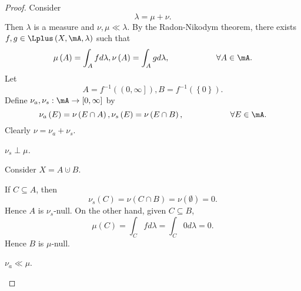 \documentclass[pmath451]{subfiles}
\begin{document}
    \begin{proof}
        Consider
        \begin{equation*}
            \lambda = \mu+\nu.
        \end{equation*}
        Then $\lambda$ is a measure and $\nu,\mu\ll\lambda$. By the Radon-Nikodym theorem, there exists $f,g\in\Lplus\left( X,\mA,\lambda \right)$ such that
        \begin{equation*}
            \mu\left( A \right) = \int_Afd\lambda, \nu\left( A \right) = \int_Agd\lambda,\hspace{2cm}\forall A\in\mA.
        \end{equation*}
        Let
        \begin{equation*}
            A = f^{-1}\left( \left( 0,\infty \right] \right), B = f^{-1}\left( \left\lbrace 0 \right\rbrace \right).
        \end{equation*}
        Define $\nu_a,\nu_s:\mA\to\left[ 0,\infty \right]$ by
        \begin{equation*}
            \nu_a\left( E \right) = \nu\left( E\cap A \right), \nu_s\left( E \right) = \nu\left( E\cap B \right), \hspace{2cm}\forall E\in\mA.
        \end{equation*}
        Clearly $\nu = \nu_a+\nu_s$.

        \begin{claim}
            \textit{$\nu_s\perp\mu$.}

            Consider $X=A\cupdot B$.

            If $C\subseteq A$, then
            \begin{equation*}
                \nu_s\left( C \right) = \nu\left( C\cap B \right) = \nu\left( \emptyset \right) = 0.
            \end{equation*}
            Hence $A$ is $\nu_s$-null. On the other hand, given $C\subseteq B$,
            \begin{equation*}
                \mu\left( C \right) = \int_Cfd\lambda = \int_C 0d\lambda = 0.
            \end{equation*}
            Hence $B$ is $\mu$-null.
        \end{claim}

        \begin{claim}
            $\nu_a\ll\mu$.


\end{claim}
\end{proof}
\end{document}
